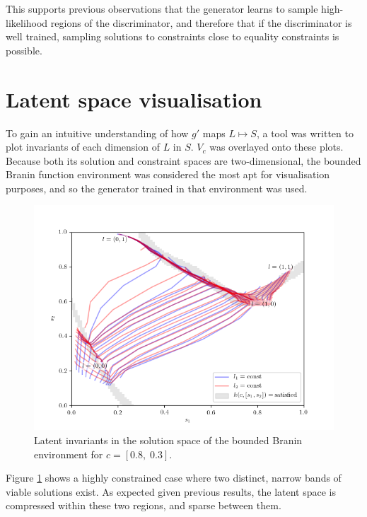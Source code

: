 \documentclass[../../main.tex]{subfiles}
\begin{document}
This supports previous observations that the generator learns to sample high-likelihood regions of the discriminator, and therefore that if the discriminator is well trained, sampling solutions to constraints close to equality constraints is possible.

\section{Latent space visualisation} \label{section:latentSpaceVisualisation}

To gain an intuitive understanding of how $g'$ maps $L\mapsto S$, a tool was written to plot invariants of each dimension of $L$ in $S$.
$V_c$ was overlayed onto these plots.
Because both its solution and constraint spaces are two-dimensional, the bounded Branin function environment was considered the most apt for visualisation purposes, and so the generator trained in that environment was used.
\begin{figure}[H]
    \begin{center}
    \includegraphics[width=\textwidth]{latentPlot0803}
    \caption[Latent Branin invariants for $c={[0.8,\;0.3]}$]{
        Latent invariants in the solution space of the bounded Branin environment for $c=[0.8,\;0.3]$.
    }
    \label{fig:latentPlot0803}
    \end{center}
\end{figure}
Figure \ref{fig:latentPlot0803} shows a highly constrained case where two distinct, narrow bands of viable solutions exist.
As expected given previous results, the latent space is compressed within these two regions, and sparse between them.
\end{document}
